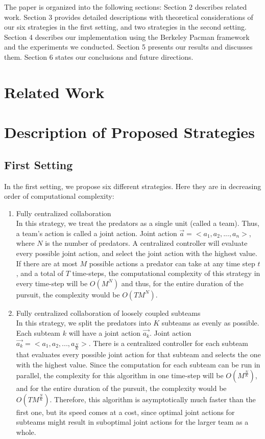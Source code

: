 \documentclass[11pt]{article}
\begin{document}
\begin{multicols}{2}
\indent The paper is organized into the following sections: Section 2 describes related work. Section 3 provides detailed descriptions with theoretical considerations of our six strategies in the first setting, and two strategies in the second setting. Section 4 describes our implementation using the Berkeley Pacman framework and the experiments we conducted. Section 5 presents our results and discusses them. Section 6 states our conclusions and future directions. 

\section{Related Work}

 
\section{Description of Proposed Strategies}
\subsection{First Setting}
In the first setting, we propose six different strategies. Here they are in decreasing order of computational complexity:\\
\begin{enumerate}[leftmargin=0.25cm]
	\item Fully centralized collaboration\\
	In this strategy, we treat the predators as a single unit (called a team). Thus, a team's action is called a joint action. Joint action $\vec{a} = <a_1, a_2, ..., a_n>$, where $N$ is the number of predators. A centralized controller will evaluate every possible joint action, and select the joint action with the highest value. If there are at most $M$ possible actions a predator can take at any time step $t$, and a total of $T$ time-steps, the computational complexity of this strategy in every time-step will be $O(M^N)$ and thus, for the entire duration of the pursuit, the complexity would be $O(TM^N)$.
	
	\item Fully centralized collaboration of loosely coupled subteams\\
	In this strategy, we split the predators into $K$ subteams as evenly as possible. Each subteam $k$ will have a joint action $\vec{a_k}$. Joint action $\vec{a_k} = <a_1, a_2, ..., a_{\frac{N}{K}}>$. There is a centralized controller for each subteam that evaluates every possible joint action for that subteam and selects the one with the highest value. Since the computation for each subteam can be run in parallel, the complexity for this algorithm in one time-step will be $O(M^{\frac{N}{K}})$, and for the entire duration of the pursuit, the complexity would be $O(TM^{\frac{N}{K}})$. Therefore, this algorithm is asymptotically much faster than the first one, but its speed comes at a cost, since optimal joint actions for subteams might result in suboptimal joint actions for the larger team as a whole. 
	

\end{enumerate}
\end{multicols}
\end{document}
